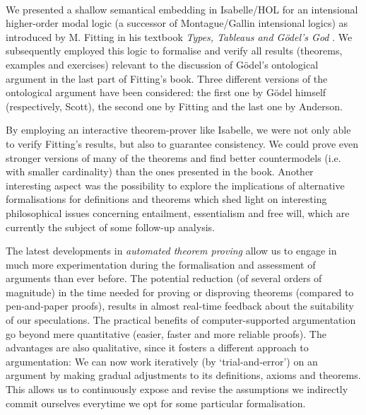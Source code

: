 \begin{isabellebody}
%
\ %
%
\isamarkupfalse%
%
%
%
%
\isamarkuptrue%
%
\begin{isamarkuptext}%
We presented a shallow semantical embedding in Isabelle/HOL for an intensional higher-order modal logic
(a successor of Montague/Gallin intensional logics) as introduced by M. Fitting in his textbook \emph{Types, Tableaus and 
G\"odel's God} \cite{Fitting}. 
We subsequently employed this logic to formalise and verify all results (theorems, examples and exercises) relevant 
to the discussion of G\"odel's ontological argument in the last part of Fitting's book. Three different versions of
the ontological argument have been considered: the first one by G\"odel himself (respectively, Scott), the second 
one by Fitting and the last one by Anderson.%
\end{isamarkuptext}\isamarkuptrue%
%
\begin{isamarkuptext}%
By employing an interactive theorem-prover like Isabelle, we were not only able to verify Fitting's results,
but also to guarantee consistency. We could prove even stronger versions
of many of the theorems and find better countermodels (i.e. with smaller cardinality) than the ones presented in the book.
Another interesting aspect was the possibility to explore the implications of alternative formalisations
for definitions and theorems which shed light on interesting philosophical issues concerning entailment,
essentialism and free will, which are currently the subject of some follow-up analysis.%
\end{isamarkuptext}\isamarkuptrue%
%
\begin{isamarkuptext}%
The latest developments in \emph{automated theorem proving} allow us to engage in much more experimentation
during the formalisation and assessment of arguments than ever before. The potential reduction (of several orders of magnitude)
in the time needed for proving or disproving theorems (compared to pen-and-paper proofs), results in almost real-time
feedback about the suitability of our speculations. The practical benefits of computer-supported argumentation go beyond
mere quantitative (easier, faster and more reliable proofs). The advantages are also qualitative, since it fosters a
different approach to argumentation: We can now work iteratively (by `trial-and-error') on an argument
by making gradual adjustments to its definitions, axioms and theorems. This allows us to continuously expose and revise 
the assumptions we indirectly commit ourselves everytime we opt for some particular formalisation.%
\end{isamarkuptext}\isamarkuptrue%
%
%
%
%
%
%
%
\end{isabellebody}%

